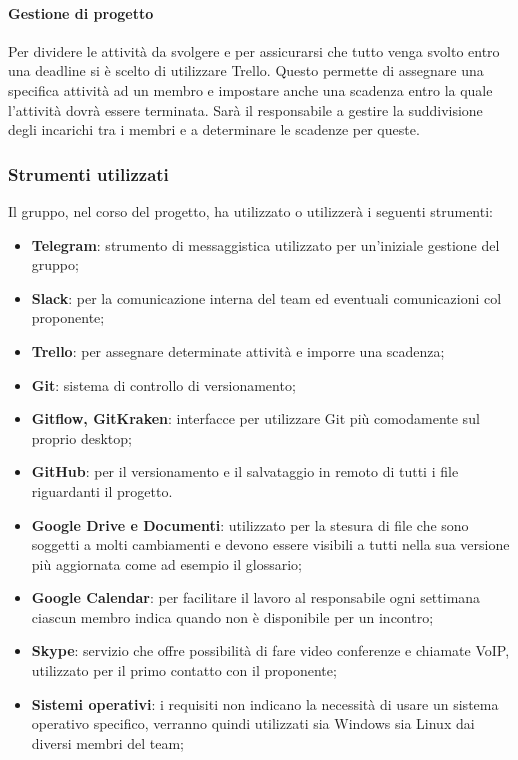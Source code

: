 			\paragraph{Gestione di progetto}
			Per dividere le attività da svolgere e per assicurarsi che tutto venga svolto entro una deadline si è scelto di utilizzare Trello. Questo permette di assegnare una specifica attività ad un membro e impostare anche una scadenza entro la quale l'attività dovrà essere terminata. Sarà il responsabile a gestire la suddivisione degli incarichi tra i membri e a determinare le scadenze per queste.
		\subsubsection{Strumenti utilizzati}
		Il gruppo, nel corso del progetto, ha utilizzato o utilizzerà i seguenti strumenti:
		\begin{itemize}
			\item \textbf{Telegram}: strumento di messaggistica utilizzato per un'iniziale gestione del gruppo;
			\item \textbf{Slack}: per la comunicazione interna del team ed eventuali comunicazioni col proponente;
			\item \textbf{Trello}: per assegnare determinate attività e imporre una scadenza;
			\item \textbf{Git}: sistema di controllo di versionamento;
			\item \textbf{Gitflow, GitKraken}: interfacce per utilizzare Git più comodamente sul proprio desktop;
			\item \textbf{GitHub}: per il versionamento e il salvataggio in remoto di tutti i file riguardanti il progetto.
			\item \textbf{Google Drive e Documenti}: utilizzato per la stesura di file che sono soggetti a molti cambiamenti e devono essere visibili a tutti nella sua versione più aggiornata come ad esempio il glossario;
			\item \textbf{Google Calendar}: per facilitare il lavoro al responsabile ogni settimana ciascun membro indica quando non è disponibile per un incontro;
			\item \textbf{Skype}: servizio che offre possibilità di fare video conferenze e chiamate VoIP, utilizzato per il primo contatto con il proponente;
			\item \textbf{Sistemi operativi}: i requisiti non indicano la necessità di usare un sistema operativo specifico, verranno quindi utilizzati sia Windows sia Linux dai diversi membri del team; %
		\end{itemize}
